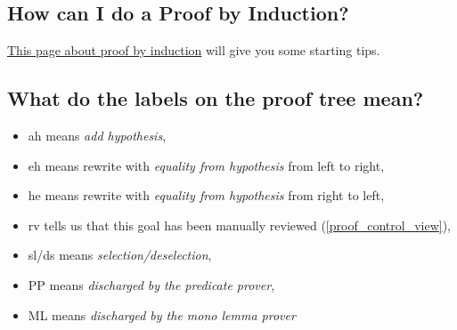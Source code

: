 \subsection{How can I do a Proof by Induction?}

\href{http://wiki.event-b.org/index.php/Induction_proof}{This page about proof by induction} will give you some starting tips.

\subsection{What do the labels on the proof tree mean?}

\begin{itemize}
	\item \textsf{ah} means \textit{add hypothesis},
	\item \textsf{eh} means rewrite with \textit{equality from hypothesis} from left to right,
	\item \textsf{he} means rewrite with \textit{equality from hypothesis} from right to left,
	\item \textsf{rv} tells us that this goal has been manually reviewed (\ref{proof_control_view}),
	\item \textsf{sl/ds} means \textit{selection/deselection},
	\item \textsf{PP} means \textit{discharged by the predicate prover},
	\item \textsf{ML} means \textit{discharged by the mono lemma prover}
\end{itemize}

